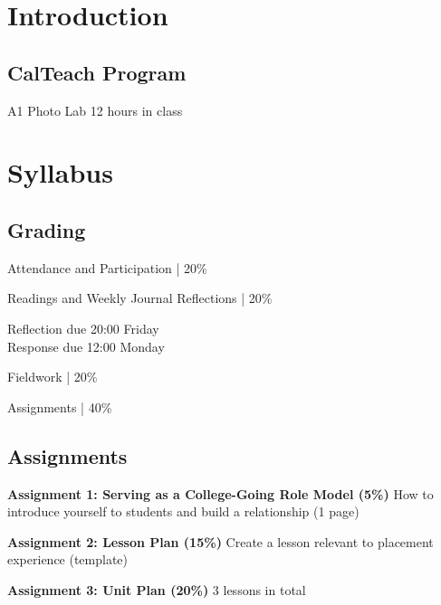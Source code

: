 \documentclass{notes}
\begin{document}
\section{Introduction}
\subsection*{CalTeach Program}
A1 Photo Lab
12 hours in class

\section{Syllabus}
\subsection*{Grading}
Attendance and Participation | 20\%

Readings and Weekly Journal Reflections | 20\%

\tab Reflection due 20:00 Friday \\
\tab Response due 12:00 Monday


Fieldwork | 20\%

Assignments | 40\%

\subsection*{Assignments}
\textbf{Assignment 1: Serving as a College-Going Role Model (5\%)}
How to introduce yourself to students and build a relationship (1 page)

\textbf{Assignment 2: Lesson Plan (15\%)}
Create a lesson relevant to placement experience (template)

\textbf{Assignment 3: Unit Plan (20\%)}
3 lessons in total
\end{document}
